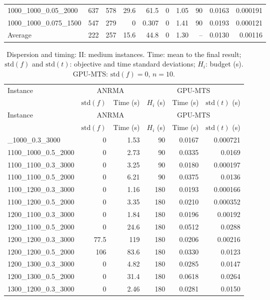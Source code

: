 \begin{landscape}
\begin{longtable}{lrrrrrrrrr}
1000\_1000\_0.05\_2000 & 637 & 578 & 29.6 & 61.5 & 0 & 1.05 & 90 & 0.0163 & 0.000191\\
1000\_1000\_0.075\_1500 & 547 & 279 & 0 & 0.307 & 0 & 1.41 & 90 & 0.0193 & 0.000121\\
\midrule
Average & 222 & 257 & 15.6 & 44.8 & 0 & 1.30 & -- & 0.0130 & 0.00116\\
\end{longtable}\clearpage
\fontsize{9}{10.5}\selectfont\setlength{\tabcolsep}{4pt}\renewcommand{\arraystretch}{.88}
\begin{longtable}{lrrrrr}
\caption{Dispersion and timing: II: medium instances. Time: mean to the final result; $\mathrm{std}(f)$ and $\mathrm{std}(t)$: objective and time standard deviations; $H_i$: budget (s). GPU-MTS: $\mathrm{std}(f)=0$, $n=10$.}\\
\toprule
Instance & \multicolumn{2}{c}{ANRMA} & \multicolumn{3}{c}{GPU-MTS}\\
 & $\mathrm{std}(f)$ & Time (s) & $H_i$ (s) & Time (s) & $\mathrm{std}(t)$ (s)\\
\midrule\endfirsthead
Instance & \multicolumn{2}{c}{ANRMA} & \multicolumn{3}{c}{GPU-MTS}\\
 & $\mathrm{std}(f)$ & Time (s) & $H_i$ (s) & Time (s) & $\mathrm{std}(t)$ (s)\\
\midrule\endhead
\bottomrule\endlastfoot
1100\_1000\_0.3\_3000 & 0 & 1.53 & 90 & 0.0167 & 0.000721\\
1100\_1000\_0.5\_2000 & 0 & 2.73 & 90 & 0.0335 & 0.0169\\
1100\_1100\_0.3\_3000 & 0 & 3.25 & 90 & 0.0180 & 0.000197\\
1100\_1100\_0.5\_2000 & 0 & 6.21 & 90 & 0.0375 & 0.0136\\
1100\_1200\_0.3\_3000 & 0 & 1.16 & 180 & 0.0193 & 0.000166\\
1100\_1200\_0.5\_2000 & 0 & 3.35 & 180 & 0.0210 & 0.000352\\
1200\_1100\_0.3\_3000 & 0 & 1.84 & 180 & 0.0196 & 0.00192\\
1200\_1100\_0.5\_2000 & 0 & 24.6 & 180 & 0.0512 & 0.0288\\
1200\_1200\_0.3\_3000 & 77.5 & 119 & 180 & 0.0206 & 0.00216\\
1200\_1200\_0.5\_2000 & 106 & 83.6 & 180 & 0.0330 & 0.0123\\
1200\_1300\_0.3\_3000 & 0 & 4.82 & 180 & 0.0285 & 0.0147\\
1200\_1300\_0.5\_2000 & 0 & 31.4 & 180 & 0.0618 & 0.0264\\
1300\_1200\_0.3\_3000 & 0 & 2.46 & 180 & 0.0281 & 0.0150\\

\end{longtable}
\end{landscape}
